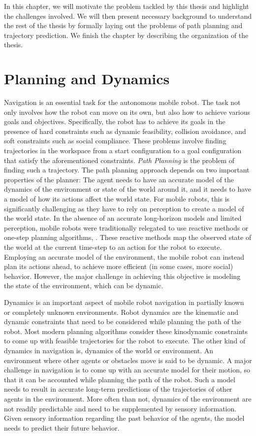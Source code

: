 In this chapter, we will motivate the problem tackled by this thesis and highlight the challenges involved. We will then present necessary background to understand the rest of the thesis by formally laying out the problems of path planning and trajectory prediction. We finish the chapter by describing the organization of the thesis. 

\section{Planning and Dynamics}
\label{sec:intro-motivation}

Navigation is an essential task for the autonomous mobile robot. The task not only involves how the robot can move on its own, but also how to achieve various goals and objectives. Specifically, the robot has to achieve its goals in the presence of hard constraints such as dynamic feasibility, collision avoidance, and soft constraints such as social compliance. These problems involve finding trajectories in the workspace from a start configuration to a goal configuration that satisfy the aforementioned constraints. \textit{Path Planning} is the problem of finding such a trajectory. The path planning approach depends on two important properties of the planner: The agent needs to have an accurate model of the dynamics of the environment or state of the world around it, and it needs to have a model of how its actions affect the world state. For mobile robots, this is significantly challenging as they have to rely on perception to create a model of the world state. In the absence of an accurate long-horizon models and limited perception, mobile robots were traditionally relegated to use reactive methods or one-step planning algorithms, \cite{fox1997dynamic,brock1999high}. These reactive methods map the observed state of the world at the current time-step to an action for the robot to execute. Employing an accurate model of the environment, the mobile robot can instead plan its actions ahead, to achieve more efficient (in some cases, more social) behavior. However, the major challenge in achieving this objective is modeling the state of the environment, which can be dynamic.

Dynamics is an important aspect of mobile robot navigation in partially known or completely unknown environments. Robot dynamics are the kinematic and dynamic constraints that need to be considered while planning the path of the robot. Most modern planning algorithms consider these kinodynamic constraints to come up with feasible trajectories for the robot to execute. The other kind of dynamics in navigation is, dynamics of the world or environment. An environment where other agents or obstacles move is said to be dynamic. A major challenge in navigation is to come up with an accurate model for their motion, so that it can be accounted while planning the path of the robot. Such a model needs to result in accurate long-term predictions of the trajectories of other agents in the environment. More often than not, dynamics of the environment are not readily predictable and need to be supplemented by sensory information. Given sensory information regarding the past behavior of the agents, the model needs to predict their future behavior.

